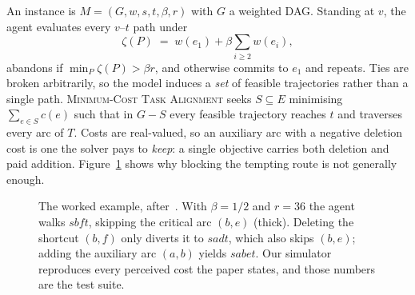 \documentclass{article}
\newcommand{\MCTA}{\textsc{Minimum-Cost Task Alignment}}
\begin{document}
An instance is $M = (G, w, s, t, \beta, r)$ with $G$ a weighted DAG. Standing at
$v$, the agent evaluates every $v$--$t$ path under
\[
  \zeta(P) \;=\; w(e_1) + \beta \sum_{i \geq 2} w(e_i),
\]
abandons if $\min_P \zeta(P) > \beta r$, and otherwise commits to $e_1$ and
repeats. Ties are broken arbitrarily, so the model induces a \emph{set} of feasible
trajectories rather than a single path. \MCTA{} seeks $S \subseteq E$ minimising
$\sum_{e \in S} c(e)$ such that in $G - S$ every feasible trajectory reaches $t$ and
traverses every arc of $T$. Costs are real-valued, so an auxiliary arc with a
negative deletion cost is one the solver pays to \emph{keep}: a single objective
carries both deletion and paid addition. Figure~\ref{fig:example} shows why blocking
the tempting route is not generally enough.

\begin{figure}[t]
\centering
{}
\caption{The worked example, after~\cite{belova2026}. With $\beta = 1/2$ and
$r = 36$ the agent walks $sbft$, skipping the critical arc $(b,e)$ (thick).
Deleting the shortcut $(b,f)$ only diverts it to $sadt$, which also skips $(b,e)$;
adding the auxiliary arc $(a,b)$ yields $sabet$. Our simulator reproduces every
perceived cost the paper states, and those numbers are the test suite.}
\label{fig:example}
\end{figure}
\end{document}
